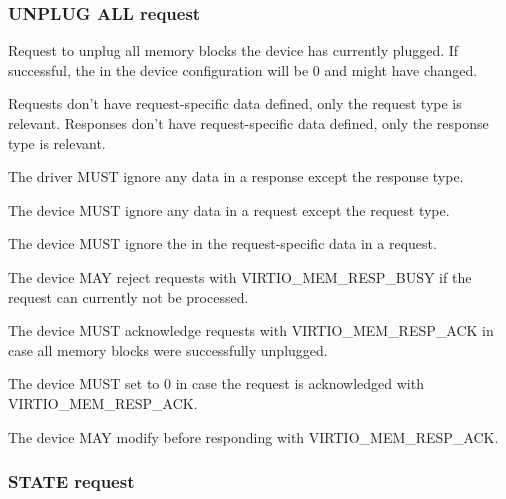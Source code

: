 \subsubsection{UNPLUG ALL request}\label{sec:Device Types / Memory Device / Device Operation / UNPLUG ALL request}

Request to unplug all memory blocks the device has currently plugged.  If
successful, the  in the device configuration will be 0
and  might have changed.

Requests don't have request-specific data defined, only the request type is
relevant.  Responses don't have request-specific data defined, only the
response type is relevant.


The driver MUST ignore any data in a response except the response type.


The device MUST ignore any data in a request except the request type.

The device MUST ignore the  in the request-specific data in
a request.

The device MAY reject requests with VIRTIO_MEM_RESP_BUSY if the request can
currently not be processed.

The device MUST acknowledge requests with VIRTIO_MEM_RESP_ACK in case all
memory blocks were successfully unplugged.

The device MUST set  to 0 in case the request is
acknowledged with VIRTIO_MEM_RESP_ACK.

The device MAY modify  before responding with
VIRTIO_MEM_RESP_ACK.

\subsubsection{STATE request}\label{sec:Device Types / Memory Device / Device Operation / STATE request}

